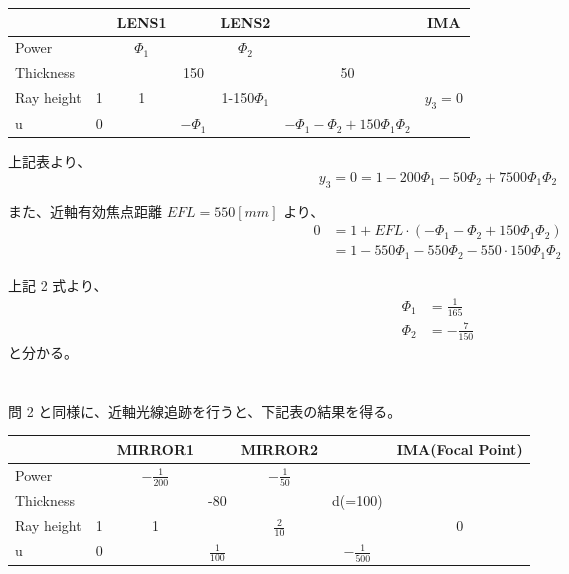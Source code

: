 \documentclass[a4paper,10pt]{jsarticle}
\begin{document}
\vspace{1\baselineskip}

\begin{center}
\begin{tabular}{l|cccccc}
	& & LENS1 & & LENS2 & & IMA \\ \hline
Power & & $\Phi_1$ & & $\Phi_2$ & & \\
Thickness & & & 150 & & 50 & \\ \hline
Ray height & 1 & 1 & & 1-150$\Phi_1$ & & $y_3 = 0$ \\
u & 0 & & $-\Phi_1$ & & $-\Phi_1 - \Phi_2 + 150 \Phi_1 \Phi_2$ & \\ \hline
\end{tabular}
\end{center}

\vspace{2\baselineskip}

上記表より、
\begin{equation*}
y_3 = 0 = 1-200\Phi_1-50\Phi_2+7500\Phi_1\Phi_2
\end{equation*}

また、近軸有効焦点距離 $ EFL=550[mm] $ より、
\begin{align*}
0 &= 1+EFL \cdot (-\Phi_1 -\Phi_2 + 150 \Phi_1 \Phi_2) \\
  &= 1 - 550\Phi_1 - 550\Phi_2 - 550 \cdot 150 \Phi_1 \Phi_2
\end{align*}

上記 2 式より、
\begin{align*}
\Phi_1 &= \frac{1}{165} \\
\Phi_2 &= -\frac{7}{150}
\end{align*}
と分かる。







\section{}
問 2 と同様に、近軸光線追跡を行うと、下記表の結果を得る。

\vspace{1\baselineskip}

\begin{center}
\begin{tabular}{l|cccccc}
	& & MIRROR1 & & MIRROR2 & & IMA(Focal Point) \\ \hline
Power & & $-\frac{1}{200}$ & & $-\frac{1}{50}$ & & \\
Thickness & & & -80 & & d(=100) & \\ \hline
Ray height & 1 & 1 & & $\frac{2}{10}$ & & 0 \\
u & 0 & & $\frac{1}{100}$ & & $-\frac{1}{500}$ & \\ \hline
\end{tabular}
\end{center}
\end{document}
